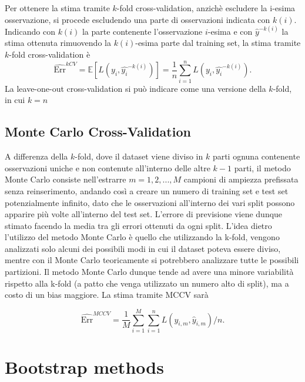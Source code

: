 Per ottenere la stima tramite $k$-fold cross-validation, anzichè escludere la i-esima osservazione, si procede escludendo una parte di osservazioni indicata con $k(i)$. Indicando con $k(i)$ la parte contenente l'osservazione $i$-esima e con $\hat{y}^{-k(i)}$ la stima ottenuta rimuovendo la $k(i)$-esima parte dal training set, la stima tramite $k$-fold cross-validation è
\begin{equation}
\widehat{\text{Err}}^{kCV} = \mathbb{E}[L(y_i, \hat{y_i}^{-k(i)})] = \frac{1}{n} \sum_{i=1}^{n} L(y_i, \hat{y_i}^{-k(i)}).
\end{equation}
La leave-one-out cross-validation si può indicare come una versione della $k$-fold, in cui $k = n$

\subsection{Monte Carlo Cross-Validation}
\label{sec:sezione5.1.3}

A differenza della $k$-fold, dove il dataset viene diviso in $k$ parti ognuna contenente osservazioni uniche e non contenute all'interno delle altre $k-1$ parti, il metodo Monte Carlo consiste nell'estrarre $m = 1,2,...,M$ campioni di ampiezza prefissata senza reinserimento, andando così a creare un numero di training set e test set potenzialmente infinito, dato che le osservazioni all'interno dei vari split possono apparire più volte all'interno del test set. L'errore di previsione viene dunque stimato facendo la media tra gli errori ottenuti da ogni split.
L'idea dietro l'utilizzo del metodo Monte Carlo è quello che utilizzando la k-fold, vengono analizzati solo alcuni dei possibili modi in cui il dataset poteva essere diviso, mentre con il Monte Carlo teoricamente si potrebbero analizzare tutte le possibili partizioni. Il metodo Monte Carlo dunque tende ad avere una minore variabilità rispetto alla k-fold (a patto che venga utilizzato un numero alto di split), ma a costo di un bias maggiore.
La stima tramite MCCV sarà

\begin{equation}
\widehat{\text{Err}}^{MCCV} = \frac{1}{M} \sum_{i=1}^{M} \sum_{i=1}^{n}L(y_{i,m}, \hat{y}_{i,m})/n.
\end{equation}


\section{Bootstrap methods}
\label{sec:sezione5.4}



